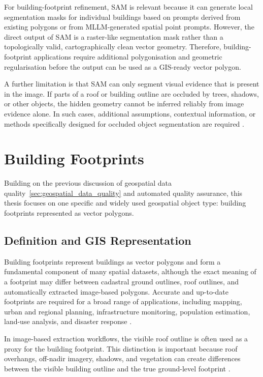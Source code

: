 For building-footprint refinement, SAM is relevant because it can generate local segmentation masks for individual buildings based on prompts derived from existing polygons or from MLLM-generated spatial point prompts. However, the direct output of SAM is a raster-like segmentation mask rather than a topologically valid, cartographically clean vector geometry. Therefore, building-footprint applications require additional polygonisation and geometric regularisation before the output can be used as a GIS-ready vector polygon.

A further limitation is that SAM can only segment visual evidence that is present in the image. If parts of a roof or building outline are occluded by trees, shadows, or other objects, the hidden geometry cannot be inferred reliably from image evidence alone. In such cases, additional assumptions, contextual information, or methods specifically designed for occluded object segmentation are required \citep{tai2025segment}.

\section{Building Footprints}
\label{sec:building_footprints}

Building on the previous discussion of geospatial data quality~\ref{sec:geospatial_data_quality} and automated quality assurance, this thesis focuses on one specific and widely used geospatial object type: building footprints represented as vector polygons.

\subsection{Definition and GIS Representation}

Building footprints represent buildings as vector polygons and form a fundamental component of many spatial datasets, although the exact meaning of a footprint may differ between cadastral ground outlines, roof outlines, and automatically extracted image-based polygons. Accurate and up-to-date footprints are required for a broad range of applications, including mapping, urban and regional planning, infrastructure monitoring, population estimation, land-use analysis, and disaster response \citep{Awrangjeb_AutomaticExtraction, sirko2021continentalscalebuildingdetectionhigh}.

In image-based extraction workflows, the visible roof outline is often used as a proxy for the building footprint. This distinction is important because roof overhangs, off-nadir imagery, shadows, and vegetation can create differences between the visible building outline and the true ground-level footprint \citep{wang2022learningextractbuildingfootprints}.


